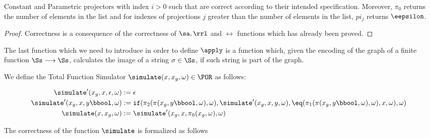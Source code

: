 \begin{conditional}{\notappendix}
    \begin{remark}
      Constant and Parametric projectors with index $i>0$ such that
      are correct according to their intended
      specification. Moreover, $\pi_0$ returns
      the number of elements in the list and
      for indexes of projections $j$ greater than
      the number of elements in the list, $pi_j$ returns $\eepsilon$.
    \end{remark}
    \begin{proof}
      Correctness is a consequence of the correctness of $\sa, \rrl$ and
      $\rel$ functions which has already been proved.
    \end{proof}

    The last function which we need to introduce in order to define $\apply$
    is a function which, given the encoding of the graph of a finite function
    $\Ss \longrightarrow \Ss$, calculates the image of a string $\sigma \in \Ss$,
    if such string is part of the graph.

    \begin{defn}
      We define the Total Function Simulator $\simulate(x, x_g, \omega) \in \POR$ as follows:

      \begin{align*}
        \simulate'(x_g, x, \epsilon, \omega) &:= \epsilon \\
        \simulate'(x_g, x, y\bbool, \omega) &:= \mathtt{if}(\pi_2(\pi(x_g,
        y\bbool,
        \omega), \omega), \simulate'(x_g, x, y, \omega),
        \eq(\pi_1(\pi(x_g,
        y\bbool,
        \omega), \omega), x, \omega), \omega) \\
        \simulate(x, x_g, \omega) &:= \simulate'(x_g, x, \pi_0(x_g, \omega), \omega)
      \end{align*}
    \end{defn}

    The correctness of the function $\simulate$ is formalized as follows


\end{conditional}
